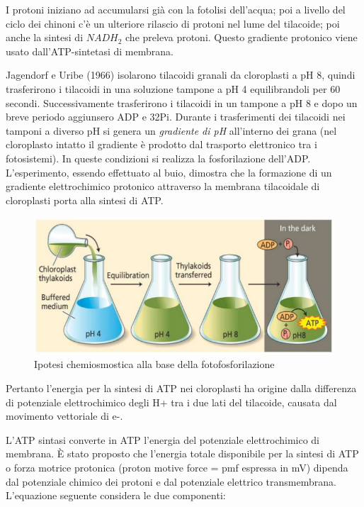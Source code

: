 \documentclass[a4paper,12pt]{book}
\begin{document}
I protoni iniziano ad accumularsi già con la fotolisi dell'acqua; poi a livello del ciclo dei chinoni c'è un ulteriore rilascio di protoni nel lume del tilacoide; poi anche la sintesi di $NADH_{2}$ che preleva protoni. Questo gradiente protonico viene usato dall'ATP-sintetasi di membrana.
 
Jagendorf e Uribe (1966) isolarono tilacoidi granali da cloroplasti a pH 8, quindi trasferirono i tilacoidi
in una soluzione tampone a pH 4 equilibrandoli per 60 secondi. Successivamente trasferirono i
tilacoidi in un tampone a pH 8 e dopo un breve periodo aggiunsero ADP e 32Pi. Durante i
trasferimenti dei tilacoidi nei tamponi a diverso pH si genera un \emph{gradiente di pH} all’interno dei grana
(nel cloroplasto intatto il gradiente è prodotto dal trasporto elettronico tra i fotosistemi). In queste
condizioni si realizza la fosforilazione dell’ADP. L’esperimento, essendo effettuato al buio, dimostra
che la formazione di un gradiente elettrochimico protonico attraverso la membrana tilacoidale di
cloroplasti porta alla sintesi di ATP.

\begin{figure}[H]
\centering
\includegraphics[scale=0.4]{immagini/chemiosmosi.jpg}
\caption{Ipotesi chemiosmostica alla base della fotofosforilazione}
\end{figure}

Pertanto l'energia per la sintesi di ATP nei cloroplasti ha origine dalla differenza di potenziale
elettrochimico degli H+ tra i due lati del tilacoide, causata dal movimento vettoriale di e-.

L’ATP sintasi converte in ATP l'energia del potenziale elettrochimico di membrana.
È stato proposto che l’energia totale disponibile per la sintesi di ATP o forza motrice protonica (proton
motive force = pmf espressa in mV) dipenda dal potenziale chimico dei protoni e dal potenziale elettrico
transmembrana. L’equazione seguente considera le due componenti:
\end{document}

